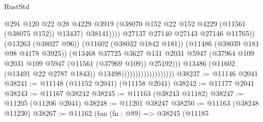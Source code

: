 \begin{lexlean}{RustStd}
\begin{coremodule}
                                                        @291
                                                        @120
                                                        @22
                                                        @28
                                                        @4229
                                                        @3919
                                                        (@38070
                                                          @152
                                                          @22
                                                          @152
                                                          @4229
                                                          (@11561 (@38075 @152))
                                                          @13437)
                                                        @38141))))
                                                @27137
                                                @27140
                                                @27143
                                                @27146
                                                @11765))
                                            (@13263 (@38027 @96))
                                            (@11602 (@38032 @1842 @181))
                                            (@11486 (@38039 @181 @98 @4178 @3925))
                                            (@13468
                                              @37725
                                              @3627
                                              @131
                                              @2031
                                              @5947
                                              (@37964
                                                @109
                                                @2031
                                                @109
                                                @5947
                                                (@11561 (@37969 @109))
                                                @25192)))
                                          @13486
                                          (@11602 (@13491 @22 @2787 @1843))
                                          @13498)))))))))))))))))))
@38237 := @11146 @2041
@38241 := @11148 (@11152 @2041) (@11158 @2041)
@38242 := @11177 @2041
@38243 := @11167 @38242
@38245 := @11163 (@38243 @11182)
@38247 := @11205 (@11206 @2041)
@38248 := @11201 @38247
@38250 := @11163 (@38248 @11230)
@38267 := @11162
    (fun (fn : @89) =>
    @38245
      (@11185

\end{coremodule}
\end{lexlean}
